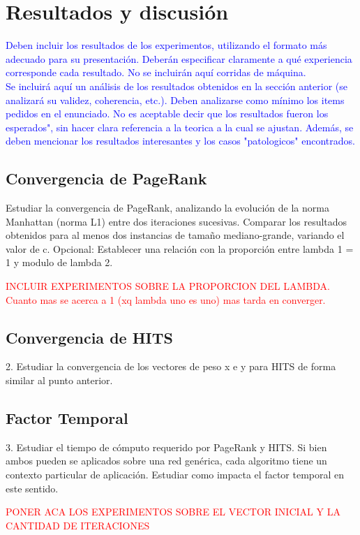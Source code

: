 \documentclass[a4paper]{article}
\begin{document}
\section{Resultados y discusi\'on}
\textcolor{blue}{Deben incluir los resultados de los experimentos, utilizando el formato m\'as adecuado
para su presentaci\'on. Deber\'an especificar claramente a qu\'e experiencia corresponde
cada resultado. No se incluir\'an aqu\'i corridas de m\'aquina.\\
Se incluir\'a aqu\'i un an\'alisis de los resultados obtenidos en la secci\'on anterior (se analizar\'a su validez, coherencia, etc.). Deben analizarse como m\'inimo los items pedidos en el enunciado. No es aceptable decir que los resultados fueron los esperados", sin hacer
clara referencia a la teorica a la cual se ajustan. Adem\'as, se deben mencionar los resultados
interesantes y los casos "patologicos" encontrados.
}
\\
\subsection{Convergencia de PageRank}
Estudiar la convergencia de PageRank, analizando la evoluci\'on de la norma Manhattan
(norma L1) entre dos iteraciones sucesivas. Comparar los resultados obtenidos para
al menos dos instancias de tama\~no mediano-grande, variando el valor de c. Opcional:
Establecer una relaci\'on con la proporci\'on entre lambda 1 = 1 y modulo de lambda 2.

\textcolor{red}{INCLUIR EXPERIMENTOS SOBRE LA PROPORCION DEL LAMBDA. Cuanto mas se acerca a 1 (xq lambda uno es uno) mas tarda en converger.}

\subsection{Convergencia de HITS}
2. Estudiar la convergencia de los vectores de peso x e y para HITS de forma similar al
punto anterior.

\subsection{Factor Temporal}
3. Estudiar el tiempo de c\'omputo requerido por PageRank y HITS. Si bien ambos pueden
se aplicados sobre una red gen\'erica, cada algoritmo tiene un contexto particular de
aplicaci\'on. Estudiar como impacta el factor temporal en este sentido.

\textcolor{red}{PONER ACA LOS EXPERIMENTOS SOBRE EL VECTOR INICIAL Y LA CANTIDAD DE ITERACIONES}
\newpage
\end{document}
